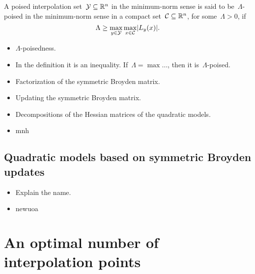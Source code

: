 \begin{definition}
    \label{def:lambda-poisedness-minimum-norm}
    A poised interpolation set~$\xpt \subseteq \R^n$ in the minimum-norm sense is said to be~$\Lambda$-poised in the minimum-norm sense in a compact set~$\mathcal{C} \subseteq \mathbb{R}^n$, for some~$\Lambda > 0$, if
    \begin{equation*}
        \Lambda \ge \max_{y \in \xpt} \max_{x \in \mathcal{C}} \abs{\lagp[y](x)}.
    \end{equation*}
\end{definition}

\begin{itemize}
    \item $\Lambda$-poisedness.
    \item In the definition it is an inequality. If~$\Lambda = \max \dots$, then it is~$\Lambda$-poised.
    \item Factorization of the symmetric Broyden matrix.
    \item Updating the symmetric Broyden matrix.
    \item Decompositions of the Hessian matrices of the quadratic models.
    \item \gls{mnh}~\cite{Wild_2008}
\end{itemize}

\subsection{Quadratic models based on symmetric Broyden updates}
\label{subsec:symmetric-broyden-updates}

\begin{itemize}
    \item Explain the name.
    \item \gls{newuoa}~\cite{Powell_2006}
\end{itemize}

\section{An optimal number of interpolation points}

